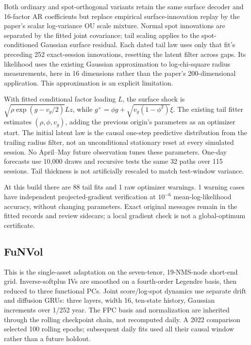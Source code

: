 \documentclass[11pt]{article}
\begin{document}
Both ordinary and spot-orthogonal variants retain the same surface decoder and 16-factor AR coefficients but replace empirical surface-innovation replay by the paper's scalar log-variance OU scale mixture. Normal spot innovations are separated by the fitted joint covariance; tail scaling applies to the spot-conditioned Gaussian surface residual. Each dated tail law uses only that fit's preceding 252 exact-session innovations, resetting the latent filter across gaps. Its likelihood uses the existing Gaussian approximation to log-chi-square radius measurements, here in 16 dimensions rather than the paper's 200-dimensional application. This approximation is an explicit limitation.

With fitted conditional factor loading $L$, the surface shock is $\sqrt{\rho\exp(g-v_g/2)}Lz$, while $g^+=\phi g+\sqrt{v_g(1-\phi^2)}\xi$. The existing tail fitter estimates $(\rho,\phi,v_g)$, adding the previous origin's parameters as an optimizer start. The initial latent law is the causal one-step predictive distribution from the trailing radius filter, not an unconditional stationary reset at every simulated session. No April--May future observation tunes these parameters. One-day forecasts use 10,000 draws and recursive tests the same 32 paths over 115 sessions. Tail thickness is not artificially rescaled to match test-window variance.

At this build there are 88 tail fits and 1 raw optimizer warnings. 1 warning cases have independent projected-gradient verification at $10^{-6}$ mean-log-likelihood accuracy, without changing parameters. Exact original messages remain in the fitted records and review sidecars; a local gradient check is not a global-optimum certificate.

\subsection{FuNVol}

This is the single-asset adaptation on the seven-tenor, 19-NMS-node short-end grid. Inverse-softplus IVs are smoothed on a fourth-order Legendre basis, then reduced to three functional PCs. Joint score/log-spot dynamics use separate drift and diffusion GRUs: three layers, width 16, ten-state history, Gaussian increments over 1/252 year. The FPC basis and normalization are inherited through the rolling checkpoint chain, not recomputed daily. A 2022 comparison selected 100 rolling epochs; subsequent daily fits used all their causal window rather than a future holdout.
\end{document}
